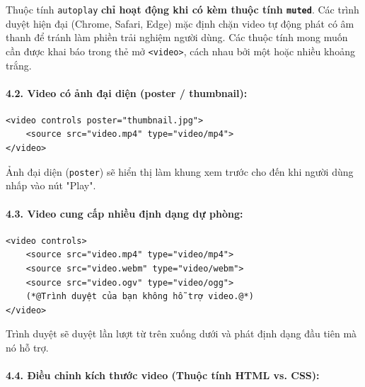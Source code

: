 \documentclass[11pt,oneside]{book}
\newcommand{\codeinline}[1]{\textcolor{accentOrange}{\texttt{#1}}}
\begin{document}
\begin{warnBox}
Thuộc tính \codeinline{autoplay} \textbf{chỉ hoạt động khi có kèm thuộc tính \codeinline{muted}}. Các trình duyệt hiện đại (Chrome, Safari, Edge) mặc định chặn video tự động phát có âm thanh để tránh làm phiền trải nghiệm người dùng. Các thuộc tính mong muốn cần được khai báo trong thẻ mở \codeinline{<video>}, cách nhau bởi một hoặc nhiều khoảng trắng.
\end{warnBox}

\paragraph{4.2. Video có ảnh đại diện (poster / thumbnail):}

\begin{codeWindow}
\begin{lstlisting}[language=HTML5]
<video controls poster="thumbnail.jpg">
    <source src="video.mp4" type="video/mp4">
</video>
\end{lstlisting}
\end{codeWindow}

Ảnh đại diện (\codeinline{poster}) sẽ hiển thị làm khung xem trước cho đến khi người dùng nhấp vào nút "Play".

\paragraph{4.3. Video cung cấp nhiều định dạng dự phòng:}

\begin{codeWindow}
\begin{lstlisting}[language=HTML5]
<video controls>
    <source src="video.mp4" type="video/mp4">
    <source src="video.webm" type="video/webm">
    <source src="video.ogv" type="video/ogg">
    (*@Trình duyệt của bạn không hỗ trợ video.@*)
</video>
\end{lstlisting}
\end{codeWindow}

Trình duyệt sẽ duyệt lần lượt từ trên xuống dưới và phát định dạng đầu tiên mà nó hỗ trợ.

\paragraph{4.4. Điều chỉnh kích thước video (Thuộc tính HTML vs. CSS):}
\end{document}

